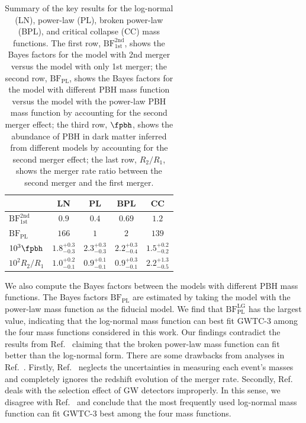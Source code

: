 \documentclass[
reprint,           %
superscriptaddress,%
amsmath,           %
amssymb,           %
aps,               %
prd,               %
notitlepage,       %
longbibliography,  %
floatfix,          %
nofootinbib,
]{revtex4-1}
\begin{document}
\begin{table}[tbp!]
	\centering
	\begin{tabular}{l|c|c|c|c}
		\hline\hline
		& LN & PL & BPL & CC \\
		\hline
		$\mathrm{BF}^{\mathrm{2nd}}_{\mathrm{1st}}$ & $0.9$ & $0.4$ & $0.69$ & $1.2$ \\
		$\mathrm{BF}_{\mathrm{PL}}$ & $166$ & $1$ & $2$ & $139$ \\
		$10^{3}\fpbh$ & $1.8^{+0.3}_{-0.3}$ & $2.3^{+0.3}_{-0.3}$ & $2.2^{+0.3}_{-0.4}$ & $1.5^{+0.2}_{-0.2}$ \\
		$10^{2}R_2/R_1$ & $1.0^{+0.2}_{-0.1}$ & $0.9^{+0.1}_{-0.1}$ & $0.9^{+0.3}_{-0.1}$ & $2.2^{+1.3}_{-0.5}$ \\
		\hline
	\end{tabular}
	\caption{\label{table:BF}Summary of the key results for the log-normal (LN), power-law (PL), broken power-law (BPL), and critical collapse (CC) mass functions. The first row, $\mathrm{BF}^{\mathrm{2nd}}_{\mathrm{1st}}$, shows the Bayes factors for the model with 2nd merger versus the model with only 1st merger; the second row, $\mathrm{BF}_{\mathrm{PL}}$, shows the Bayes factors for the model with different PBH mass function versus the model with the power-law PBH mass function by accounting for the second merger effect; the third row, $\fpbh$, shows the abundance of PBH in dark matter inferred from different models by accounting for the second merger effect; the last row, $R_2/R_1$, shows the merger rate ratio between the second merger and the first merger.}
\end{table}

We also compute the Bayes factors between the models with different PBH mass functions. The Bayes factors $\mathrm{BF}_{\mathrm{PL}}$ are estimated by taking the model with the power-law mass function as the fiducial model. 
We find that $\mathrm{BF}_{\mathrm{PL}}^{\mathrm{LG}}$ has the largest value, indicating that the log-normal mass function can best fit GWTC-3 among the four mass functions considered in this work. Our findings contradict the results from Ref.~\cite{Deng:2021ezy} claiming that the broken power-law mass function can fit better than the log-normal form. There are some drawbacks from analyses in Ref.~\cite{Deng:2021ezy}. Firstly, Ref.~\cite{Deng:2021ezy} neglects the uncertainties in measuring each event's masses and completely ignores the redshift evolution of the merger rate. Secondly, Ref.~\cite{Deng:2021ezy} deals with the selection effect of GW detectors improperly. In this sense, we disagree with Ref.~\cite{Deng:2021ezy} and conclude that the most frequently used log-normal mass function can fit GWTC-3 best among the four mass functions.
\end{document}
